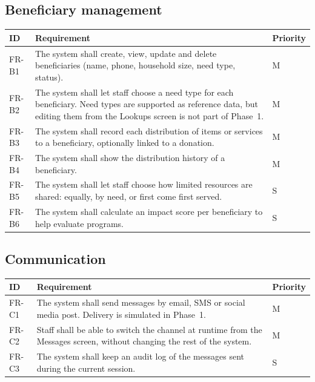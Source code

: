 \subsection{Beneficiary management}

\begin{center}
\footnotesize
\begin{tabularx}{\textwidth}{@{}L{0.09\textwidth}YL{0.11\textwidth}@{}}
\toprule
\textbf{ID} & \textbf{Requirement} & \textbf{Priority} \\
\midrule
FR-B1 & The system shall create, view, update and delete beneficiaries (name, phone, household size, need type, status). & M \\
FR-B2 & The system shall let staff choose a need type for each beneficiary. Need types are supported as reference data, but editing them from the Lookups screen is not part of Phase~1. & M \\
FR-B3 & The system shall record each distribution of items or services to a beneficiary, optionally linked to a donation. & M \\
FR-B4 & The system shall show the distribution history of a beneficiary. & M \\
FR-B5 & The system shall let staff choose how limited resources are shared: equally, by need, or first come first served. & S \\
FR-B6 & The system shall calculate an impact score per beneficiary to help evaluate programs. & S \\
\bottomrule
\end{tabularx}
\end{center}

\subsection{Communication}

\begin{center}
\footnotesize
\begin{tabularx}{\textwidth}{@{}L{0.09\textwidth}YL{0.11\textwidth}@{}}
\toprule
\textbf{ID} & \textbf{Requirement} & \textbf{Priority} \\
\midrule
FR-C1 & The system shall send messages by email, SMS or social media post. Delivery is simulated in Phase~1. & M \\
FR-C2 & Staff shall be able to switch the channel at runtime from the Messages screen, without changing the rest of the system. & M \\
FR-C3 & The system shall keep an audit log of the messages sent during the current session. & S \\
\bottomrule
\end{tabularx}
\end{center}

